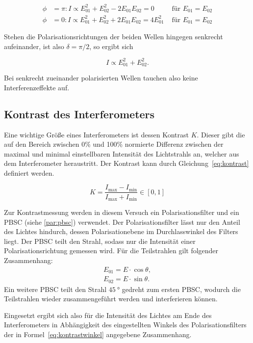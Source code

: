 \begin{align}
\phi &= \pi : I\propto E_{01}^2 + E_{02}^2 - 2E_{01}E_{02}
= 0 &\text{ für } E_{01}=E_{02}\\
\phi &= 0 : I\propto E_{01}^2 + E_{02}^2 + 2E_{01}E_{02}
= 4E_{01}^2 &\text{ für } E_{01}=E_{02}
\end{align}

Stehen die Polarisationsrichtungen der beiden Wellen hingegen senkrecht aufeinander, ist also $\delta = \pi/2$, so ergibt sich

\begin{equation}
I \propto E_{01}^2 + E_{02}^2.
\end{equation}

Bei senkrecht zueinander polarisierten Wellen tauchen also keine Interferenzeffekte auf.


\subsection{Kontrast des Interferometers}
Eine wichtige Größe eines Interferometers ist dessen Kontrast $K$. Dieser gibt die auf den Bereich zwischen 0\% und 100\% normierte Differenz zwischen der maximal und minimal einstellbaren Intensität des Lichtstrahls an, welcher aus dem Interferometer heraustritt. Der Kontrast kann durch Gleichung~\eqref{eq:kontrast} definiert werden.

\begin{equation}
K = \frac{I_\text{max}-I_\text{min}}{I_\text{max}+I_\text{min}} \in [0,1]
\label{eq:kontrast}
\end{equation}

Zur Kontrastmessung werden in diesem Versuch ein Polarisationsfilter und ein PBSC (siehe \ref{par:pbsc}) verwendet. Der Polarisationsfilter lässt nur den Anteil des Lichtes hindurch, dessen Polarisationebene im Durchlasswinkel des Filters liegt.
Der PBSC teilt den Strahl, sodass nur die Intensität einer Polarisationsrichtung gemessen wird.
Für die Teilstrahlen gilt folgender Zusammenhang:
\begin{align*}
E_{01}=E\cdot\cos \theta,\\
E_{02}=E\cdot\sin \theta.
\end{align*}
Ein weitere PBSC teilt den Strahl $\SI{45}{°}$ gedreht zum ersten PBSC, wodurch die Teilstrahlen wieder zusammengeführt werden und interferieren können.

Eingesetzt ergibt sich also für die Intensität des Lichtes am Ende des Interferometers in Abhängigkeit des
eingestellten Winkels des Polarisationsfilters der in Formel~\eqref{eq:kontrastwinkel} angegebene Zusammenhang.

